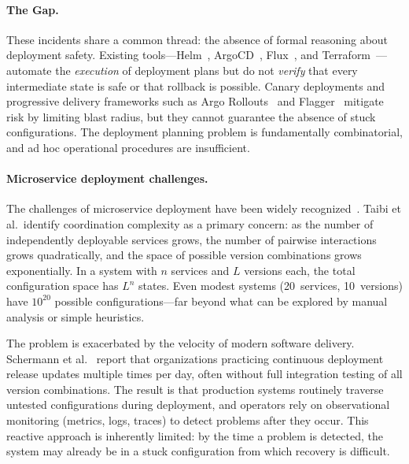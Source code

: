 \documentclass[10pt,twocolumn]{article}
\begin{document}
\paragraph{The Gap.}
These incidents share a common thread: the absence of formal
reasoning about deployment safety. Existing tools---Helm~\cite{helm},
ArgoCD~\cite{argocd}, Flux~\cite{flux}, and Terraform~\cite{terraform}---automate
the \emph{execution} of deployment plans but do not \emph{verify}
that every intermediate state is safe or that rollback is possible.
Canary deployments and progressive delivery frameworks such as
Argo Rollouts~\cite{argo-rollouts} and Flagger~\cite{flagger}
mitigate risk by limiting blast radius, but they cannot guarantee
the absence of stuck configurations. The deployment planning
problem is fundamentally combinatorial, and ad hoc operational
procedures are insufficient.

\paragraph{Microservice deployment challenges.}
The challenges of microservice deployment have been widely
recognized~\cite{taibi-microservices-2017}. Taibi et al.\ identify
coordination complexity as a primary concern: as the number of
independently deployable services grows, the number of
pairwise interactions grows quadratically, and the space of
possible version combinations grows exponentially. In a system
with $n$ services and $L$ versions each, the total
configuration space has $L^n$ states. Even modest systems
(20~services, 10~versions) have $10^{20}$ possible
configurations---far beyond what can be explored by manual
analysis or simple heuristics.

The problem is exacerbated by the velocity of modern
software delivery. Schermann et al.~\cite{schermann-progressive-2018}
report that organizations practicing continuous deployment
release updates multiple times per day, often without full
integration testing of all version combinations. The result is
that production systems routinely traverse untested
configurations during deployment, and operators rely on
observational monitoring (metrics, logs, traces) to detect
problems after they occur. This reactive approach is inherently
limited: by the time a problem is detected, the system may
already be in a stuck configuration from which recovery is
difficult.
\end{document}
